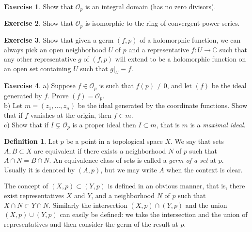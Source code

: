 \documentclass[12pt,openany]{book}
\newcommand{\C}{{\mathbb{C}}}
\newcommand{\sO}{{\mathcal{O}}}
\newcommand{\myindex}[1]{#1\index{#1}}
\theoremstyle{plain}
\theoremstyle{remark}
\theoremstyle{definition}
\newtheorem{defn}[thm]{Definition}
\newenvironment{exbox}{%
    \def\FrameCommand{\vrule width 1pt \relax\hspace {10pt}}%
    \MakeFramed {\advance \hsize -\width \FrameRestore }%
}{%
    \endMakeFramed
}
\theoremstyle{exercise}
\newtheorem{exercise}{Exercise}[section]
\theoremstyle{example}
\begin{document}
\begin{exbox}
\begin{exercise}
Show that $\sO_p$ is an integral domain (has no zero divisors).
\end{exercise}

\begin{exercise}
Show that $\sO_p$ is isomorphic to the ring of convergent power series.
\end{exercise}

\begin{exercise}
Show that given a germ $(f,p)$ of a holomorphic function,
we can always pick an open neighborhood $U$
of $p$ and a representative $f \colon U \to \C$ such that any other
representative $g$
of $(f,p)$ will extend to be a holomorphic function on an open set containing
$U$ such that $g|_U \equiv f$.
\end{exercise}

\begin{exercise}
a) Suppose $f \in \sO_p$ is such that $f(p) \not= 0$, and let
$(f)$ be the ideal generated by $f$.  Prove $(f) = \sO_p$.\\
b) Let $m = (z_1,\ldots,z_n)$ be the ideal generated by the coordinate
functions.  Show that if $f$ vanishes at the origin, then $f \in m$.
\\
c) Show that if $I \subsetneq \sO_p$ is a proper ideal then
$I \subset m$, that is $m$ is a \emph{\myindex{maximal ideal}}.
\end{exercise}
\end{exbox}


\begin{defn}
Let $p$ be a point in a topological space $X$.
We say that sets $A, B \subset X$ are equivalent
if there exists a neighborhood $N$ of $p$
such that $A \cap N = B \cap N$.
An equivalence class of sets 
is called a \emph{\myindex{germ of a set}} at $p$.
Usually it is denoted by $(A,p)$, but we may write $A$ when
the context is clear.
\end{defn}

The concept of $(X,p) \subset (Y,p)$ is defined in an obvious manner,
that is, there exist representatives $X$ and $Y$, and a neighborhood $N$
of $p$ such that $X \cap N \subset Y \cap N$.
Similarly the intersection $(X,p) \cap (Y,p)$ and
the union $(X,p) \cup (Y,p)$ can easily be defined: we take the intersection
and the union of representatives and then consider the germ of the result at $p$.
\end{document}
